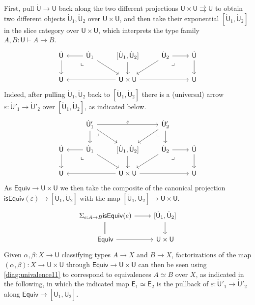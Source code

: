 \documentclass[12pt,reqno]{amsart}
\renewcommand{\to}{\ensuremath{\rightarrow}}
\newcommand{\tto}{\ensuremath{\rightrightarrows}}
\newcommand{\T}{\ensuremath{\mathsf{U}}}
\newcommand{\TT}{\ensuremath{\dot{\mathsf{U}}}}
\newcommand{\pbcorner}{\arrow[dr,phantom,"\lrcorner" very near start, shift right=.5ex]} %
\newcommand{\pbcornerright}{\arrow[dl,phantom,"\llcorner" very near start, shift left=.5ex]} %
\theoremstyle{remark}
\theoremstyle{definition}
\begin{document}
First, pull $\TT \to \T$ back along the two different projections $\T \times \T \tto \T$ to obtain two different objects $\TT_1, \TT_2$ over $\T \times \T$, and then take their exponential $[\TT_1, \TT_2]$ in the slice category over ${\T \times \T}$, which interprets the type family $A, B : \T \vdash A \to B$.
\begin{equation*}\label{diag:univalence1}
\begin{tikzcd} 
	\TT \ar[d] & \TT_1 \ar[l] \ar[rd] \pbcornerright &\ar[d] [\TT_1, \TT_2] & \TT_2 \ar[ld] \ar[r] \pbcorner & \TT \ar[d] \\  
	\T && \ar[ll]  \T \times \T \ar[rr] && \T
	 \end{tikzcd}
 \end{equation*}
 Indeed, after pulling $\TT_1, \TT_2$ back to $[\TT_1, \TT_2]$ there is a (universal) arrow $\varepsilon : \TT'_1 \to \TT'_2$ over $[\TT_1, \TT_2]$, as indicated below.
 \begin{equation}\label{diag:univalence11}
\begin{tikzcd} 
& \TT'_1  \ar[d] \arrow[dr,phantom,"\lrcorner" very near start, shift right=1.5ex] \ar[rd] \ar[rr,"\varepsilon"] 
	&& \TT'_2 \ar[ld]  \arrow[dl,phantom,"\llcorner" very near start, shift left=1.5ex] \ar[d] & \\  
	\TT \ar[d] & \TT_1 \ar[l] \ar[rd] \pbcornerright &\ar[d] [\TT_1, \TT_2]& \TT_2 \ar[ld] \ar[r] \pbcorner & \TT \ar[d] \\  
	\T && \ar[ll]  \T \times \T \ar[rr] && \T
	 \end{tikzcd}
 \end{equation}
%
As $\mathsf{Equiv} \to \T \times \T$ we then take the composite of the canonical projection $\mathsf{isEquiv}(\varepsilon) \to [\TT_1, \TT_2]$ with the map $[\TT_1, \TT_2] \to  \T \times \T$.
%
\begin{equation}\label{diag:univalence2}
\begin{tikzcd} 
{\Sigma_{e : A\to B}\mathsf{isEquiv}(e)}  \ar[d, equals] \ar[r] & {[\TT_1, \TT_2]}  \ar[d]\\
\mathsf{Equiv} \ar[r] &  \T \times \T
 \end{tikzcd}
 \end{equation}
%
Given $\alpha, \beta : X \to \T$ classifying types $A\to X$ and $B \to X$, factorizations of the map $(\alpha, \beta) : X \to \T \times \T $ through $\mathsf{Equiv} \to \T \times \T$ can then be seen using \eqref{diag:univalence11}  to correspond to equivalences $A\simeq B$ over $X$, as indicated in the following, in which the indicated map $\mathsf{E}_1\simeq\mathsf{E}_2$ is the pullback of  $\varepsilon : \TT'_1\to \TT'_2$ along $\mathsf{Equiv}\to {[\TT_1, \TT_2]}$.
\end{document}
